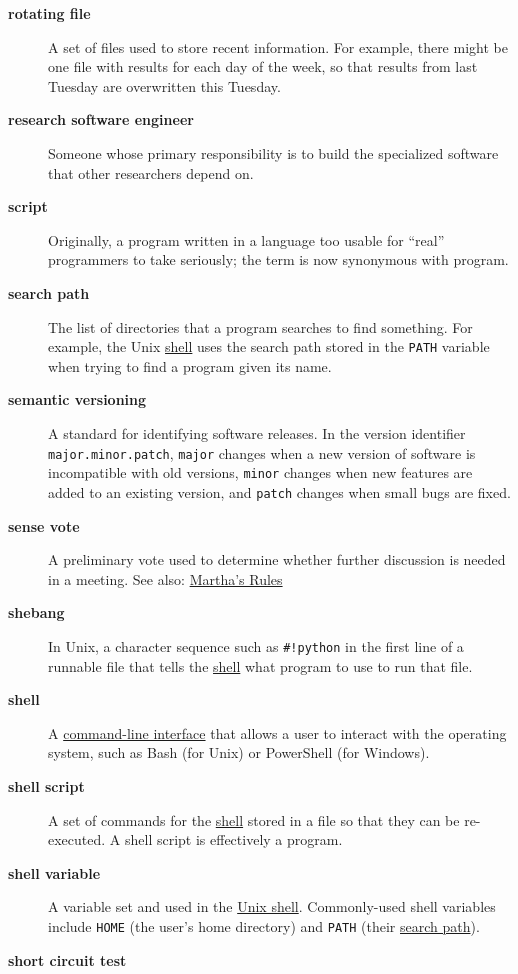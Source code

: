\documentclass[
]{krantz}
\begin{document}
\begin{description}
\item[\textbf{rotating file}]
A set of files used to store recent information. For example, there might be one file with results for each day of the week, so that results from last Tuesday are overwritten this Tuesday.
\item[\textbf{research software engineer}]
Someone whose primary responsibility is to build the specialized software that other researchers depend on.
\item[\textbf{script}]
Originally, a program written in a language too usable for ``real'' programmers to take seriously; the term is now synonymous with program.
\item[\textbf{search path}]
The list of directories that a program searches to find something. For example, the Unix \protect\hyperlink{shell}{shell} uses the search path stored in the \texttt{PATH} variable when trying to find a program given its name.
\item[\textbf{semantic versioning}]
A standard for identifying software releases. In the version identifier \texttt{major.minor.patch}, \texttt{major} changes when a new version of software is incompatible with old versions, \texttt{minor} changes when new features are added to an existing version, and \texttt{patch} changes when small bugs are fixed.
\item[\textbf{sense vote}]
A preliminary vote used to determine whether further discussion is needed in a meeting. See also: \protect\hyperlink{marthas_rules}{Martha's Rules}
\item[\textbf{shebang}]
In Unix, a character sequence such as \texttt{\#!python} in the first line of a runnable file that tells the \protect\hyperlink{shell}{shell} what program to use to run that file.
\item[\textbf{shell}]
A \protect\hyperlink{cli}{command-line interface} that allows a user to interact with the operating system, such as Bash (for Unix) or PowerShell (for Windows).
\item[\textbf{shell script}]
A set of commands for the \protect\hyperlink{shell}{shell} stored in a file so that they can be re-executed. A shell script is effectively a program.
\item[\textbf{shell variable}]
A variable set and used in the \protect\hyperlink{shell}{Unix shell}. Commonly-used shell variables include \texttt{HOME} (the user's home directory) and \texttt{PATH} (their \protect\hyperlink{search_path}{search path}).
\item[\textbf{short circuit test}]

\end{description}
\end{document}

